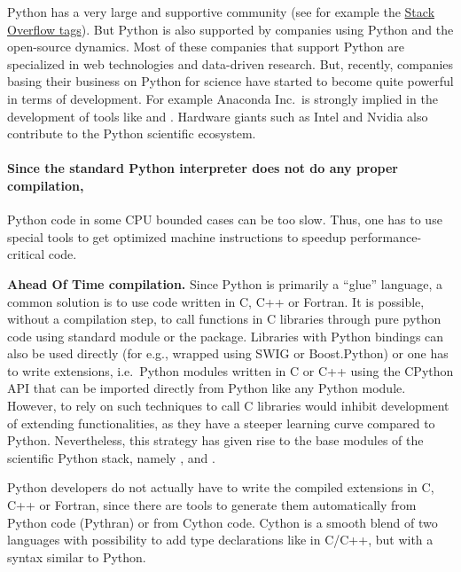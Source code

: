Python has a very large and supportive community (see for example
the \href{http://stackoverflow.com/tags}{Stack Overflow tags}).
%
But Python is also supported by companies using Python and the open-source
dynamics.  Most of these companies that support Python are specialized in
web technologies and data-driven research.  But, recently, companies basing
their business
on Python for science have started to become quite powerful in terms of
development. For example Anaconda Inc.\ is strongly implied in the development of
tools like  and . Hardware giants such as Intel and Nvidia
also contribute to the Python scientific ecosystem.



\paragraph{Since the standard Python interpreter does not do any proper
compilation,} Python code in some CPU bounded cases can be too slow.  Thus, one
has to use special tools to get optimized machine instructions to speedup
performance-critical code.

\textbf{Ahead Of Time compilation.}  Since Python is primarily a ``glue''
language, a common solution is to use code written in C, C++ or Fortran.
%
%
It is possible, without a compilation step, to call functions in C libraries
through pure python code using  standard module or the 
package.
%
Libraries with Python bindings can also be used directly (for e.g., wrapped
using SWIG or Boost.Python) or one has to write extensions, i.e.\ Python
modules written in C or C++ using the CPython API that can be imported directly
from Python like any Python module.
%
However, to rely on such techniques to call C libraries would inhibit
development of extending functionalities, as they have a steeper learning
curve compared to Python.
%
Nevertheless, this strategy has given rise to the base modules of the scientific
Python stack, namely \Numpy, \Scipy and .

Python developers do not actually have to write the compiled extensions in C,
C++ or Fortran, since there are tools to generate them automatically from
Python code (Pythran) or from Cython code. Cython \citep{behnel_cython2011} is a
smooth blend of two languages with possibility to add type declarations like in
C/C++, but with a syntax similar to Python.

